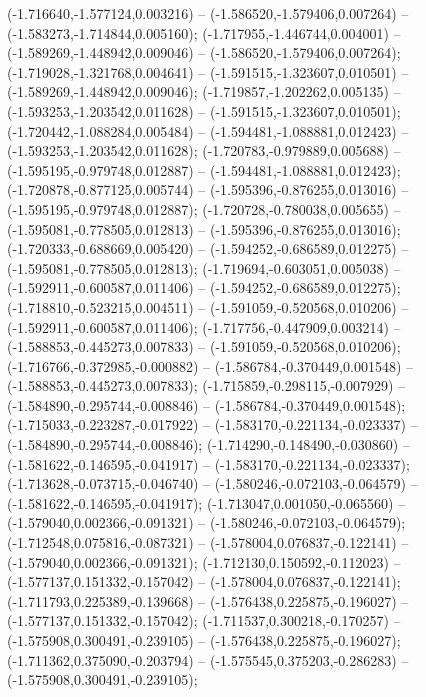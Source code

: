  (-1.716640,-1.577124,0.003216) -- (-1.586520,-1.579406,0.007264) -- (-1.583273,-1.714844,0.005160);
 (-1.717955,-1.446744,0.004001) -- (-1.589269,-1.448942,0.009046) -- (-1.586520,-1.579406,0.007264);
 (-1.719028,-1.321768,0.004641) -- (-1.591515,-1.323607,0.010501) -- (-1.589269,-1.448942,0.009046);
 (-1.719857,-1.202262,0.005135) -- (-1.593253,-1.203542,0.011628) -- (-1.591515,-1.323607,0.010501);
 (-1.720442,-1.088284,0.005484) -- (-1.594481,-1.088881,0.012423) -- (-1.593253,-1.203542,0.011628);
 (-1.720783,-0.979889,0.005688) -- (-1.595195,-0.979748,0.012887) -- (-1.594481,-1.088881,0.012423);
 (-1.720878,-0.877125,0.005744) -- (-1.595396,-0.876255,0.013016) -- (-1.595195,-0.979748,0.012887);
 (-1.720728,-0.780038,0.005655) -- (-1.595081,-0.778505,0.012813) -- (-1.595396,-0.876255,0.013016);
 (-1.720333,-0.688669,0.005420) -- (-1.594252,-0.686589,0.012275) -- (-1.595081,-0.778505,0.012813);
 (-1.719694,-0.603051,0.005038) -- (-1.592911,-0.600587,0.011406) -- (-1.594252,-0.686589,0.012275);
 (-1.718810,-0.523215,0.004511) -- (-1.591059,-0.520568,0.010206) -- (-1.592911,-0.600587,0.011406);
 (-1.717756,-0.447909,0.003214) -- (-1.588853,-0.445273,0.007833) -- (-1.591059,-0.520568,0.010206);
 (-1.716766,-0.372985,-0.000882) -- (-1.586784,-0.370449,0.001548) -- (-1.588853,-0.445273,0.007833);
 (-1.715859,-0.298115,-0.007929) -- (-1.584890,-0.295744,-0.008846) -- (-1.586784,-0.370449,0.001548);
 (-1.715033,-0.223287,-0.017922) -- (-1.583170,-0.221134,-0.023337) -- (-1.584890,-0.295744,-0.008846);
 (-1.714290,-0.148490,-0.030860) -- (-1.581622,-0.146595,-0.041917) -- (-1.583170,-0.221134,-0.023337);
 (-1.713628,-0.073715,-0.046740) -- (-1.580246,-0.072103,-0.064579) -- (-1.581622,-0.146595,-0.041917);
 (-1.713047,0.001050,-0.065560) -- (-1.579040,0.002366,-0.091321) -- (-1.580246,-0.072103,-0.064579);
 (-1.712548,0.075816,-0.087321) -- (-1.578004,0.076837,-0.122141) -- (-1.579040,0.002366,-0.091321);
 (-1.712130,0.150592,-0.112023) -- (-1.577137,0.151332,-0.157042) -- (-1.578004,0.076837,-0.122141);
 (-1.711793,0.225389,-0.139668) -- (-1.576438,0.225875,-0.196027) -- (-1.577137,0.151332,-0.157042);
 (-1.711537,0.300218,-0.170257) -- (-1.575908,0.300491,-0.239105) -- (-1.576438,0.225875,-0.196027);
 (-1.711362,0.375090,-0.203794) -- (-1.575545,0.375203,-0.286283) -- (-1.575908,0.300491,-0.239105);
